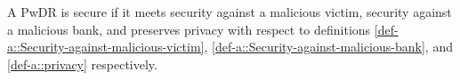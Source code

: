 



\begin{definition}[Security]\label{def-a::PwDR-security}
A PwDR is secure if it meets security against a malicious victim,  security against a malicious bank, and preserves privacy with respect to definitions \ref{def-a::Security-against-malicious-victim}, \ref{def-a::Security-against-malicious-bank}, and \ref{def-a::privacy} respectively. 
\end{definition}




%  
%  
%   
%   
%   
%   
%   
%
%
%  
%
%
%
%
%













